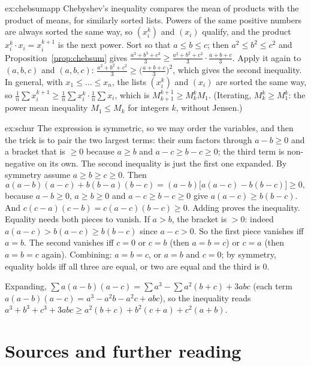 \begin{solution}{ex:chebsumapp}
\idea Chebyshev's inequality compares the mean of products with the product of means, for similarly sorted lists. Powers of the same positive numbers are always sorted the same way, so $(x_i^k)$ and $(x_i)$ qualify, and the product $x_i^k\cdot x_i=x_i^{k+1}$ is the next power.
\writeup Sort so that $a\le b\le c$; then $a^2\le b^2\le c^2$ and Proposition~\ref{prop:chebsum} gives $\frac{a^3+b^3+c^3}3\ge\frac{a^2+b^2+c^2}3\cdot\frac{a+b+c}3$. Apply it again to $(a,b,c)$ and $(a,b,c)$: $\frac{a^2+b^2+c^2}3\ge\bigl(\frac{a+b+c}3\bigr)^2$, which gives the second inequality. In general, with $x_1\le\dots\le x_n$, the lists $(x_i^k)$ and $(x_i)$ are sorted the same way, so $\frac1n\sum x_i^{k+1}\ge\frac1n\sum x_i^k\cdot\frac1n\sum x_i$, which is $M_{k+1}^{k+1}\ge M_k^kM_1$. (Iterating, $M_k^k\ge M_1^k$: the power mean inequality $M_1\le M_k$ for integers $k$, without Jensen.)
\end{solution}

\begin{solution}{ex:schur}
\idea The expression is symmetric, so we may order the variables, and then the trick is to pair the two largest terms: their sum factors through $a-b\ge0$ and a bracket that is $\ge0$ because $a\ge b$ and $a-c\ge b-c\ge0$; the third term is non-negative on its own. The second inequality is just the first one expanded.
\writeup By symmetry assume $a\ge b\ge c\ge0$. Then
\[
a(a-b)(a-c)+b(b-a)(b-c)=(a-b)\bigl[a(a-c)-b(b-c)\bigr]\ge0,
\]
because $a-b\ge0$, $a\ge b\ge0$ and $a-c\ge b-c\ge0$ give $a(a-c)\ge b(b-c)$. And $c(c-a)(c-b)=c(a-c)(b-c)\ge0$. Adding proves the inequality. Equality needs both pieces to vanish. If $a>b$, the bracket is $>0$: indeed $a(a-c)>b(a-c)\ge b(b-c)$ since $a-c>0$. So the first piece vanishes iff $a=b$. The second vanishes iff $c=0$ or $c=b$ (then $a=b=c$) or $c=a$ (then $a=b=c$ again). Combining: $a=b=c$, or $a=b$ and $c=0$; by symmetry, equality holds iff all three are equal, or two are equal and the third is $0$.

Expanding, $\sum a(a-b)(a-c)=\sum a^3-\sum a^2(b+c)+3abc$ (each term $a(a-b)(a-c)=a^3-a^2b-a^2c+abc$), so the inequality reads $a^3+b^3+c^3+3abc\ge a^2(b+c)+b^2(c+a)+c^2(a+b)$.
\end{solution}

\section*{Sources and further reading}

